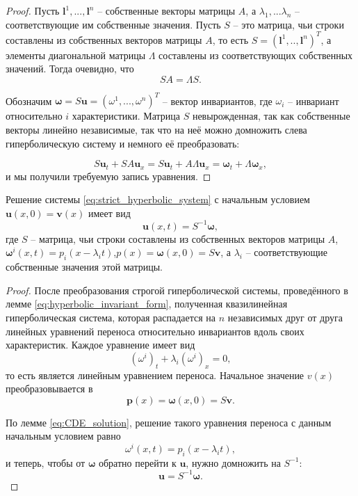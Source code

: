 \documentclass[../main.tex]{subfile}
\begin{document}
\begin{proof}
	Пусть $\boldsymbol l^1,...,\boldsymbol l^n$ -- собственные векторы
	матрицы $A$, а $\lambda_1,...\lambda_n$ -- соответствующие им
	собственные значения. Пусть $S$ -- это матрица, чьи строки составлены из
	собственных векторов матрицы $A$, то есть $S=(\boldsymbol l^1,..,
	\boldsymbol l^n)^T$, а элементы диагональной матрицы $\Lambda$
	составлены из соответствующих собственных значений. Тогда очевидно, что
	\[SA=\Lambda S.\]

	Обозначим $\boldsymbol\omega=S\boldsymbol u=(\omega^1,...,\omega^n)^T$
	-- вектор инвариантов, где $\omega_i$ -- инвариант относительно $i$
	характеристики. Матрица $S$ невырожденная, так как собственные векторы
	линейно независимые, так что на неё можно домножить слева
	гиперболическую систему и немного её преобразовать:

	\[S\boldsymbol u_t+SA\boldsymbol u_x=S\boldsymbol u_t+A\Lambda
	\boldsymbol u_x=\boldsymbol\omega_t+\Lambda\boldsymbol\omega_x,\]
	и мы получили требуемую запись уравнения.
\end{proof}

\begin{theorem}
	Решение системы \eqref{eq:strict_hyperbolic_system} с начальным условием
	$\boldsymbol u(x,0)=\boldsymbol{v}(x)$ имеет вид
	\[\boldsymbol u(x,t)=S^{-1}\boldsymbol\omega,\]
	где $S$ -- матрица, чьи строки составлены из собственных векторов
	матрицы $A$, $\boldsymbol\omega^i(x,t)=p_i(x-\lambda_i t)$,\quad $p(x)=
	\boldsymbol\omega(x,0)=S\boldsymbol v$, а $\lambda_i$ --
	соответствующие собственные значения этой матрицы.
\end{theorem}

\begin{proof}
	После преобразования строгой гиперболической системы, проведённого в
	лемме \eqref{eq:hyperbolic_invariant_form}, полученная квазилинейная
	гиперболическая система, которая распадается на $n$ независимых друг от
	друга линейных уравнений переноса относительно инвариантов вдоль своих
	характеристик. Каждое уравнение имеет вид
	\[(\omega^i)_t+\lambda_i(\omega^i)_x=0,\]
	то есть является линейным уравнением переноса. Начальное значение $v(x)$
	преобразовывается в
	\[\boldsymbol p(x)=\boldsymbol\omega(x,0)=S\boldsymbol v.\]

	По лемме \eqref{eq:CDE_solution}, решение такого уравнения переноса
	с данным начальным условием равно
	\[\omega^i(x,t)=p_i(x-\lambda_i t),\]
	и теперь, чтобы от $\boldsymbol\omega$ обратно перейти к
	$\boldsymbol u$, нужно домножить на $S^{-1}$:
	\[\boldsymbol u=S^{-1}\boldsymbol\omega.\]
\end{proof}
\end{document}
